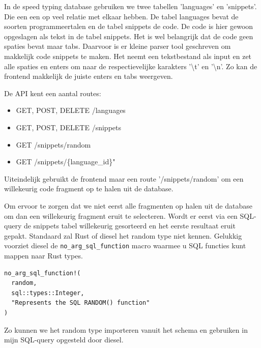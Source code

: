 In de speed typing database gebruiken we twee tabellen 'languages' en 'snippets'. Die een een op
veel relatie met elkaar hebben. De tabel languages bevat de soorten programmeertalen en de tabel
snippets de code. De code is hier gewoon opgeslagen als tekst in de tabel snippets. Het is wel
belangrijk dat de code geen spaties bevat maar tabs. Daarvoor is er kleine parser tool geschreven om
makkelijk code snippets te maken. Het neemt een tekstbestand als input en zet alle spaties en enters
om naar de respectievelijke karakters '\textbackslash t' en '\textbackslash n'. Zo kan de frontend
makkelijk de juiste enters en tabs weergeven. 

De API kent een aantal routes:
\begin{itemize}
    \item GET, POST, DELETE  /languages
    \item GET, POST, DELETE /snippets 
    \item GET /snippets/random 
    \item GET /snippets/\{language\_id\}"
\end{itemize}

Uiteindelijk gebruikt de frontend maar een route '/snippets/random' om een willekeurig code fragment
op te halen uit de database. 

Om ervoor te zorgen dat we niet eerst alle fragmenten op halen uit de database om dan een willekeurig
fragment eruit te selecteren. Wordt er eerst via een SQL-query de snippets tabel willekeurig gesorteerd
en het eerste resultaat eruit gepakt. Standaard zal Rust of diesel het random type niet kennen.
Gelukkig voorziet diesel de \texttt{no_arg_sql_function} macro waarmee u SQL functies kunt
mappen naar Rust types.

\begin{listing}[h]
\begin{verbatim}
no_arg_sql_function!(
  random,
  sql::types::Integer,
  "Represents the SQL RANDOM() function"
)
\end{verbatim}
\end{listing}

Zo kunnen we het random type importeren vanuit het schema en gebruiken in mijn SQL-query opgesteld
door diesel.
